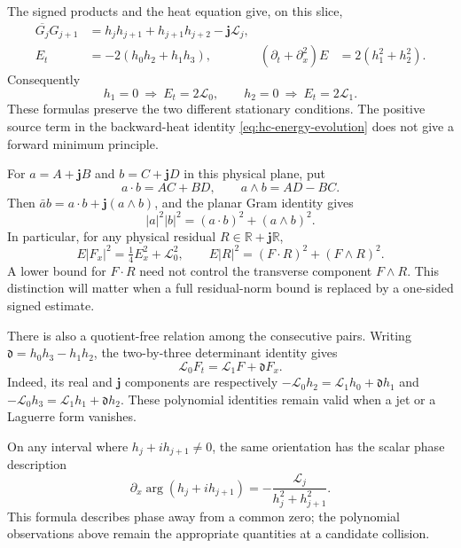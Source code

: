 \documentclass[11pt]{article}
\numberwithin{equation}{section}
\theoremstyle{definition}
\theoremstyle{remark}
\newcommand{\R}{\mathbb R}
\newcommand{\jj}{\mathbf j}
\newcommand{\Lag}{\mathcal L}
\begin{document}
The signed products and the heat equation give, on this slice,
\begin{align}
 \overline{G_j}G_{j+1}
   &=h_jh_{j+1}+h_{j+1}h_{j+2}-\jj\mathcal L_j,
   \label{eq:hc-signed-product}\\
 E_t&=-2(h_0h_2+h_1h_3),&
 (\partial_t+\partial_x^2)E&=2(h_1^2+h_2^2).
 \label{eq:hc-energy-evolution}
\end{align}
Consequently
\begin{equation}
 h_1=0\ \Longrightarrow\ E_t=2\mathcal L_0,
 \qquad
 h_2=0\ \Longrightarrow\ E_t=2\mathcal L_1.
 \label{eq:hc-stationary-energy}
\end{equation}
These formulas preserve the two different stationary conditions. The
positive source term in the backward-heat identity
\eqref{eq:hc-energy-evolution} does not give a forward minimum principle.

For \(a=A+\jj B\) and \(b=C+\jj D\) in this physical plane, put
\[
 a\cdot b=AC+BD,\qquad a\wedge b=AD-BC.
\]
Then \(\bar a b=a\cdot b+\jj(a\wedge b)\), and the planar Gram
identity gives
\begin{equation}
 |a|^2|b|^2=(a\cdot b)^2+(a\wedge b)^2.
 \label{eq:hc-planar-gram}
\end{equation}
In particular, for any physical residual \(R\in\R+\jj\R\),
\begin{equation}
 E|F_x|^2=\tfrac14E_x^2+\Lag_0^2,\qquad
 E|R|^2=(F\cdot R)^2+(F\wedge R)^2.
 \label{eq:hc-radial-transverse}
\end{equation}
A lower bound for \(F\cdot R\) need not control the transverse
component \(F\wedge R\).  This distinction will matter when a full
residual-norm bound is replaced by a one-sided signed estimate.

There is also a quotient-free relation among the consecutive pairs.
Writing \(\mathfrak d=h_0h_3-h_1h_2\), the two-by-three determinant
identity gives
\begin{equation}
 \Lag_0F_t=\Lag_1F+\mathfrak d F_x.
 \label{eq:hc-plucker}
\end{equation}
Indeed, its real and \(\jj\) components are respectively
\(-\Lag_0h_2=\Lag_1h_0+\mathfrak d h_1\) and
\(-\Lag_0h_3=\Lag_1h_1+\mathfrak d h_2\).  These polynomial
identities remain valid when a jet or a Laguerre form vanishes.

On any interval where \(h_j+ih_{j+1}\ne0\), the same orientation has
the scalar phase description
\begin{equation}
 \partial_x\arg(h_j+ih_{j+1})
 =-\frac{\Lag_j}{h_j^2+h_{j+1}^2}.
 \label{eq:hc-phase}
\end{equation}
This formula describes phase away from a common zero; the polynomial
observations above remain the appropriate quantities at a candidate
collision.
\end{document}
